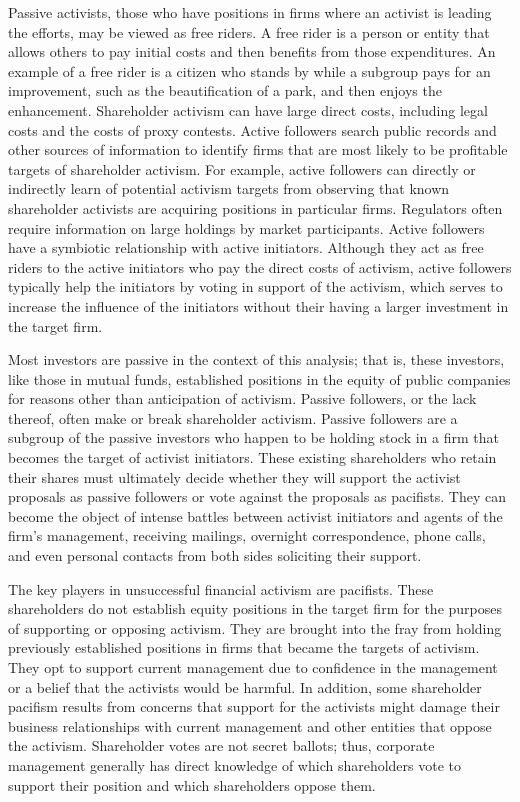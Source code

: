 \documentclass[11pt]{article}
\begin{document}
Passive activists, those who have positions in firms where an activist is leading the efforts, may be viewed as free riders. A free rider is a person or entity that allows others to pay initial costs and then benefits from those expenditures. An example of a free rider is a citizen who stands by while a subgroup pays for an improvement, such as the beautification of a park, and then enjoys the enhancement. Shareholder activism can have large direct costs, including legal costs and the costs of proxy contests. Active followers search public records and other sources of information to identify firms that are most likely to be profitable targets of shareholder activism. For example, active followers can directly or indirectly learn of potential activism targets from observing that known shareholder activists are acquiring positions in particular firms. Regulators often require information on large holdings by market participants. Active followers have a symbiotic relationship with active initiators. Although they act as free riders to the active initiators who pay the direct costs of activism, active followers typically help the initiators by voting in support of the activism, which serves to increase the influence of the initiators without their having a larger investment in the target firm.

Most investors are passive in the context of this analysis; that is, these investors, like those in mutual funds, established positions in the equity of public companies for reasons other than anticipation of activism. Passive followers, or the lack thereof, often make or break shareholder activism. Passive followers are a subgroup of the passive investors who happen to be holding stock in a firm that becomes the target of activist initiators. These existing shareholders who retain their shares must ultimately decide whether they will support the activist proposals as passive followers or vote against the proposals as pacifists. They can become the object of intense battles between activist initiators and agents of the firm's management, receiving mailings, overnight correspondence, phone calls, and even personal contacts from both sides soliciting their support.

The key players in unsuccessful financial activism are pacifists. These shareholders do not establish equity positions in the target firm for the purposes of supporting or opposing activism. They are brought into the fray from holding previously established positions in firms that became the targets of activism. They opt to support current management due to confidence in the management or a belief that the activists would be harmful. In addition, some shareholder pacifism results from concerns that support for the activists might damage their business relationships with current management and other entities that oppose the activism. Shareholder votes are not secret ballots; thus, corporate management generally has direct knowledge of which shareholders vote to support their position and which shareholders oppose them.
\end{document}
